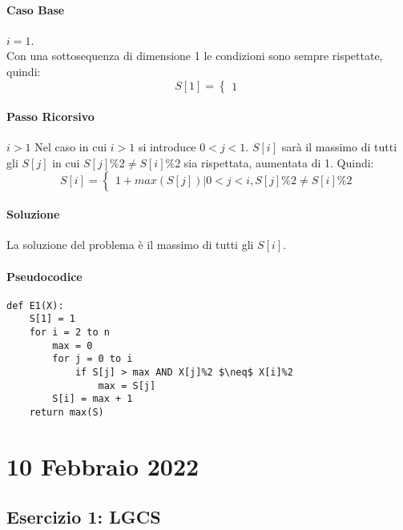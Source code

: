 \documentclass[12pt, a4paper, openany]{book}
\begin{document}
\paragraph*{Caso Base} $i=1$.
\\Con una sottosequenza di dimensione 1 le condizioni sono sempre rispettate, quindi:
$$
S[1]= \begin{cases}
	1
\end{cases}
$$
\paragraph*{Passo Ricorsivo} $i>1$
Nel caso in cui $i>1$ si introduce $0<j<1$. 
$S[i]$ sarà il massimo di tutti gli $S[j]$ in cui $S[j]\%2 \neq S[i]\%2$ sia rispettata, aumentata di 1.
Quindi:
$$
S[i]= \begin{cases}
	1 + max(S[j]) | 0 < j < i, S[j]\%2 \neq S[i]\%2
\end{cases}
$$
\paragraph*{Soluzione}
La soluzione del problema è il massimo di tutti gli $S[i]$.

\paragraph*{Pseudocodice}
\begin{lstlisting}[style=small]
def E1(X):
	S[1] = 1
	for i = 2 to n
		max = 0
		for j = 0 to i
			if S[j] > max AND X[j]%2 $\neq$ X[i]%2
				max = S[j]
		S[i] = max + 1
	return max(S) 
\end{lstlisting}

\section{10 Febbraio 2022}
\subsection{Esercizio 1: LGCS}
\end{document}
